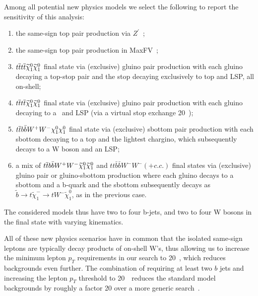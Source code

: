 Among all potential new physics models we select the following to report the sensitivity of this analysis:
\begin{enumerate}
\item the same-sign top pair production via $Z^\prime$~\cite{sstop,fcnczprime};
\item the same-sign top pair production in MaxFV~\cite{mxflv3};
\item $t\overline{t} t\overline{t} \widetilde\chi_1^0\widetilde\chi_1^0$ final state via (exclusive) gluino pair production with 
each gluino decaying a top-stop pair and the stop decaying
exclusively to top and LSP, all on-shell;
\item $t\overline{t} t\overline{t} \widetilde\chi_1^0\widetilde\chi_1^0$ final state via (exclusive) gluino pair production with 
each gluino decaying to a \ttbar\ and LSP (via a virtual stop exchange 20~\TeV);
\item $t\overline{t} b\bar{b} W^+W^- \chi_1^0\chi_1^0 $ final state via (exclusive) sbottom pair production with each 
sbottom decaying to a top and the lightest chargino, which subsequently decays to a W boson and an LSP;
\item a mix of $t\overline{t} b\bar{b} W^+W^- \widetilde\chi_1^0\widetilde\chi_1^0 $ and 
  $tt \bar{b}\bar{b} W^- W^-  (+c.c.)$ final states via (exclusive) gluino pair or gluino-sbottom
  production where each gluino decays to a sbottom and a b-quark and the sbottom subsequently decays as
  $\widetilde{b} \to t \widetilde{\chi}^-_1 \to t W^- \widetilde{\chi}^0_1  $, as in the previous case.
\end{enumerate}
The considered models thus have two to four b-jets, and two to four W bosons in the final state with varying kinematics.

All of these new physics scenarios have in common that the isolated same-sign leptons are typically decay products of on-shell W's,
thus allowing us to increase the minimum lepton $p_T$ requirements in our search to 20~\GeV, which reduces backgrounds even further.
The combination of requiring at least two $b$ jets and increasing the lepton $p_T$ threshold to 20~\GeV\ reduces the standard model backgrounds
by roughly a factor 20 over a more generic search~\cite{sspaper2010,sspaper2011}.


 
